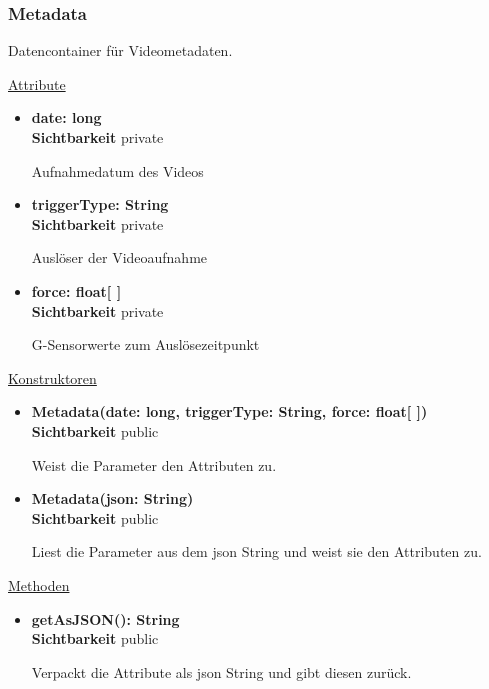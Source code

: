 \subsubsection{Metadata} \label{app:klasse:Metadata}
Datencontainer für Videometadaten. \newline

\underline{Attribute}
\begin{itemize}
\itemsep0pt
\item \textbf{date: long} \hfill\\ 
\textbf{Sichtbarkeit} private

Aufnahmedatum des Videos

\item \textbf{triggerType: String} \hfill\\ 
\textbf{Sichtbarkeit} private

Auslöser der Videoaufnahme

\item \textbf{force: float[ ]} \hfill\\ 
\textbf{Sichtbarkeit} private

G-Sensorwerte zum Auslösezeitpunkt
\end{itemize}

\underline{Konstruktoren}
\begin{itemize}
\itemsep0pt
\item \textbf{Metadata(date: long, triggerType: String, force: float[ ])} \hfill\\
\textbf{Sichtbarkeit} public

Weist die Parameter den Attributen zu.

\item \textbf{Metadata(json: String)} \hfill\\
\textbf{Sichtbarkeit} public

Liest die Parameter aus dem json String und weist sie den Attributen zu.
\end{itemize}

\underline{Methoden}
\begin{itemize}
\itemsep0pt
\item \textbf{getAsJSON(): String}\hfill\\
\textbf{Sichtbarkeit} public

Verpackt die Attribute als json String und gibt diesen zurück.

\end{itemize}